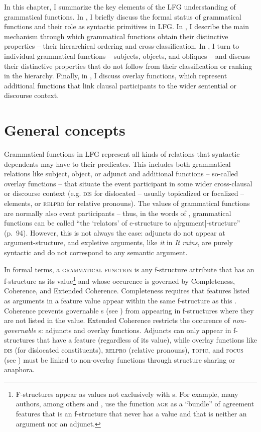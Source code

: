 \documentclass[output=paper]{../langscibook}
\begin{document}
 In this chapter, I summarize the key elements of the LFG understanding of grammatical functions. In , I briefly discuss the formal status of grammatical functions and their role as syntactic primitives in LFG. In , I describe the main mechanism through which grammatical functions obtain their distinctive properties -- their hierarchical ordering and cross-classification. In , I turn to individual grammatical functions -- subjects, objects, and obliques -- and discuss their distinctive properties that do not follow from their classification or ranking in the hierarchy. Finally, in , I discuss overlay functions, which represent additional functions that link clausal participants to the wider sentential or discourse context.
 
 \section{General concepts\label{sect:gfs:genconc}}
 
 Grammatical functions in LFG represent all kinds of relations that syntactic dependents may have to their predicates. This includes both grammatical relations like subject, object, or adjunct and additional functions -- so-called overlay functions -- that situate the event participant in some wider cross-clausal or discourse context (e.g. \textsc{dis} for dislocated -- usually topicalized or focalized -- elements, or \textsc{relpro} for relative pronouns). The values of grammatical functions are normally also event participants -- thus, in the words of \citet{BresnanEtAl2016}, grammatical functions can be called ``the `relators' of c-structure to a[rgument]-structure'' (p.~94). However, this is not always the case: adjuncts do not appear at argument-structure, and expletive arguments, like \textit{it} in \textit{It rains}, are purely syntactic and do not correspond to any semantic argument. 
 
 In formal terms, a \textsc{grammatical function} is any f-structure attribute that has an f-structure as its value\footnote{F-structures appear as values not exclusively with {\GF}s. For example, many authors, among others \citet{AV:LFG14} and \citet{haug-nikitina2015}, use the function \textsc{agr} as a ``bundle'' of agreement features that is an f-structure that never has a \PRED value and that is neither an argument nor an adjunct.} and whose occurence is governed by Completeness, Coherence, and Extended Coherence. Completeness requires that features listed as arguments in a \PRED feature value appear within the same f-structure as this \PRED. Coherence prevents governable {\GF}s  (see ) from appearing in f-structures where they are not listed in the \PRED value. Extended Coherence restricts the occurence of \textit{non-governable} {\GF}s: adjuncts and overlay functions. Adjuncts can only appear in f-structures that have a \PRED feature (regardless of its value), while overlay functions like \textsc{dis} (for dislocated constituents), \textsc{relpro} (relative pronouns), \textsc{topic}, and \textsc{focus} (see ) must be linked to non-overlay functions through structure sharing or anaphora.
 
\end{document}
